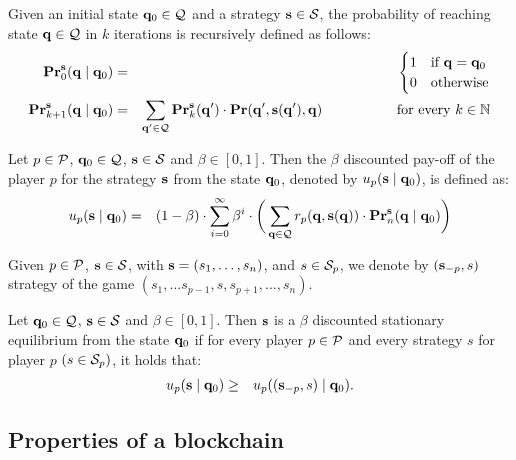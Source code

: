 Given an initial state $\mathbf{q}_0 \in \mathcal{Q}$ and a strategy $\mathbf{s} \in \mathcal{S}$, the probability of reaching state $\mathbf{q} \in \mathcal{Q}$ in $k$ iterations is recursively defined as follows:
\begin{eqnarray*}
\mathbf{Pr}_0^{\mathbf{s}}(\mathbf{q} \mid \mathbf{q}_0) & = &
\begin{cases}
1 & \text{if } \mathbf{q} = \mathbf{q}_0\\
0 & \text{otherwise}
\end{cases}\\
\mathbf{Pr}_{k+1}^{\mathbf{s}}(\mathbf{q} \mid \mathbf{q}_0) & = & \sum_{\mathbf{q}' \in \mathcal{Q}} \mathbf{Pr}_k^{\mathbf{s}}(\mathbf{q}') \cdot \mathbf{Pr}(\mathbf{q}', \mathbf{s}(\mathbf{q}'), \mathbf{q}) \quad \quad \quad  \quad \quad \text{ for every } k \in \mathbb{N}
\end{eqnarray*}


\begin{mydef}
Let $p \in \mathcal{P}$, $\mathbf{q}_0 \in \mathcal{Q}$, $\mathbf{s} \in \mathcal{S}$ and $\beta \in [0,1]$. Then the $\beta$ discounted pay-off of the player $p$ for the strategy $\mathbf{s}$ from the state $\mathbf{q}_0$, denoted by $u_p(\mathbf{s} \mid \mathbf{q}_0)$, is defined as:
\begin{eqnarray*}
u_p(\mathbf{s} \mid \mathbf{q}_0) & = & (1 - \beta) \cdot \sum_{i=0}^{\infty}\beta^{i} \cdot  \bigg(\sum_{\mathbf{q} \in \mathcal{Q}} r_p(\mathbf{q},\mathbf{s}(\mathbf{q})) \cdot 
\mathbf{Pr}_n^{\mathbf{s}}(\mathbf{q} \mid \mathbf{q}_0)\bigg)
\end{eqnarray*}
\end{mydef}
Given $p \in \mathcal{P}$, $\mathbf{s} \in \mathcal{S}$, with $\mathbf{s} = (s_1, \ldots, s_n)$, and $s \in \mathcal{S}_p$, we denote by $(\mathbf{s}_{-p}, s)$ strategy of the game $(s_1, \ldots s_{p-1},s,s_{p+1}, \ldots, s_{n})$.
\begin{mydef}
Let $\mathbf{q}_0 \in \mathcal{Q}$, $\mathbf{s} \in \mathcal{S}$ and $\beta \in [0,1]$. Then $\mathbf{s}$ is a $\beta$ discounted stationary equilibrium from the state $\mathbf{q}_0$ if for every player $p \in \mathcal{P}$ and every strategy $s$ for player $p$ $(s \in\mathcal{S}_p)$, it holds that:
\begin{eqnarray*}
u_p(\mathbf{s} \mid \mathbf{q}_0)  & \geq  & u_p ((\mathbf{s}_{-p},s) \mid \mathbf{q}_0).
\end{eqnarray*}
\end{mydef}

\subsection{Properties of a blockchain}

